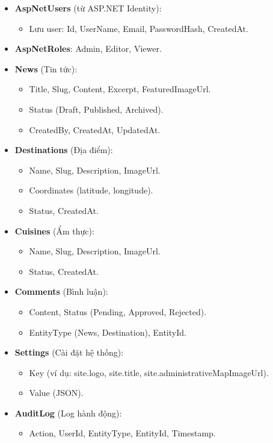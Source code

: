 \documentclass[12pt,a4paper,oneside]{report}
\begin{document}
\begin{itemize}[itemsep=3pt]
  \item \textbf{AspNetUsers} (từ ASP.NET Identity):
  \begin{itemize}
    \item Lưu user: Id, UserName, Email, PasswordHash, CreatedAt.
  \end{itemize}
  
  \item \textbf{AspNetRoles}: Admin, Editor, Viewer.
  
  \item \textbf{News} (Tin tức):
  \begin{itemize}
    \item Title, Slug, Content, Excerpt, FeaturedImageUrl.
    \item Status (Draft, Published, Archived).
    \item CreatedBy, CreatedAt, UpdatedAt.
  \end{itemize}
  
  \item \textbf{Destinations} (Địa điểm):
  \begin{itemize}
    \item Name, Slug, Description, ImageUrl.
    \item Coordinates (latitude, longitude).
    \item Status, CreatedAt.
  \end{itemize}
  
  \item \textbf{Cuisines} (Ẩm thực):
  \begin{itemize}
    \item Name, Slug, Description, ImageUrl.
    \item Status, CreatedAt.
  \end{itemize}
  
  \item \textbf{Comments} (Bình luận):
  \begin{itemize}
    \item Content, Status (Pending, Approved, Rejected).
    \item EntityType (News, Destination), EntityId.
  \end{itemize}
  
  \item \textbf{Settings} (Cài đặt hệ thống):
  \begin{itemize}
    \item Key (ví dụ: site.logo, site.title, site.administrativeMapImageUrl).
    \item Value (JSON).
  \end{itemize}
  
  \item \textbf{AuditLog} (Log hành động):
  \begin{itemize}
    \item Action, UserId, EntityType, EntityId, Timestamp.
  \end{itemize}
\end{itemize}
\end{document}
